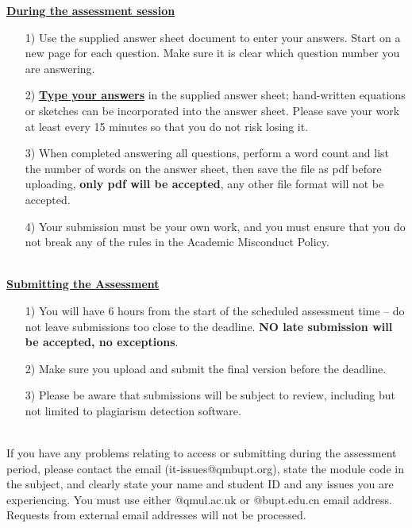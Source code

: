 \documentclass[11pt]{article}
\begin{document}
	\textbf{\underline{During the assessment session}}
	\begin{enumerate}
		\item[1) ] Use the supplied answer sheet document to enter your answers. Start on a new page for each question. Make sure it is clear which question number you are answering.
		\item[2) ] \textbf{\underline{Type your answers}} in the supplied answer sheet; hand-written equations or sketches can be incorporated into the answer sheet. Please save your work at least every 15 minutes so that you do not 
		risk losing it.
		\item[3) ] When completed answering all questions, perform a word count and list the number of words on the answer sheet, then save the file as pdf before uploading, \textbf{only pdf will be accepted}, any other file format will not be accepted.
		\item[4) ] Your submission must be your own work, and you must ensure that you do not break any of the rules in the Academic Misconduct Policy.
	\end{enumerate}
	~\\
	
	\textbf{\underline{Submitting the Assessment}}
	\begin{enumerate}
		\item[1) ] You will have 6 hours from the start of the scheduled assessment time – do not leave submissions too close to the deadline. \textbf{NO late submission will be accepted, no exceptions}.
		\item[2) ] Make sure you upload and submit the final version before the deadline.
		\item[3) ] Please be aware that submissions will be subject to review, including but not limited to plagiarism detection software.
	\end{enumerate}
	~\\
	
	If you have any problems relating to access or submitting during the assessment period, please contact 
	the email (it-issues@qmbupt.org), state the module code in the subject, and clearly state your name 
	and student ID and any issues you are experiencing. You must use either @qmul.ac.uk or 
	@bupt.edu.cn email address. Requests from external email addresses will not be processed.
	
	
	\newpage
	
\end{document}
